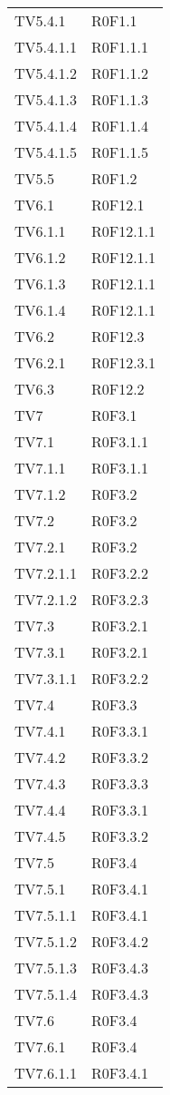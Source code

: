 \documentclass[PianoDiQualifica.tex]{subfiles}
\begin{document}
\begin{longtable}[H]{P{6.5cm}P{7cm}}
	TV5.4.1  & R0F1.1 \\ 
	TV5.4.1.1  & R0F1.1.1 \\ 
	TV5.4.1.2  & R0F1.1.2 \\ 
	TV5.4.1.3  & R0F1.1.3 \\ 
	TV5.4.1.4  & R0F1.1.4 \\ 
	TV5.4.1.5  & R0F1.1.5 \\ 
	TV5.5  & R0F1.2 \\ 
	TV6.1  & R0F12.1 \\ 
	TV6.1.1  & R0F12.1.1 \\ 
	TV6.1.2  & R0F12.1.1 \\ 
	TV6.1.3  & R0F12.1.1 \\ 
	TV6.1.4  & R0F12.1.1 \\ 
	TV6.2  & R0F12.3 \\ 
	TV6.2.1  & R0F12.3.1 \\ 
	TV6.3 &  R0F12.2 \\ 
	TV7  & R0F3.1 \\ 
	TV7.1  & R0F3.1.1 \\ 
	TV7.1.1  & R0F3.1.1 \\ 
	TV7.1.2  & R0F3.2 \\ 
	TV7.2  & R0F3.2 \\ 
	TV7.2.1  & R0F3.2 \\ 
	TV7.2.1.1  & R0F3.2.2 \\ 
	TV7.2.1.2  & R0F3.2.3 \\ 
	TV7.3  & R0F3.2.1 \\ 
	TV7.3.1  & R0F3.2.1 \\ 
	TV7.3.1.1  & R0F3.2.2 \\ 
	TV7.4  & R0F3.3 \\ 
	TV7.4.1  & R0F3.3.1 \\ 
	TV7.4.2  & R0F3.3.2 \\ 
	TV7.4.3  & R0F3.3.3 \\ 
	TV7.4.4  & R0F3.3.1 \\ 
	TV7.4.5  & R0F3.3.2 \\ 
	TV7.5  & R0F3.4 \\ 
	TV7.5.1  & R0F3.4.1 \\ 
	TV7.5.1.1  & R0F3.4.1 \\ 
	TV7.5.1.2  & R0F3.4.2 \\ 
	TV7.5.1.3 & R0F3.4.3\\ 
	TV7.5.1.4 & R0F3.4.3 \\ 
	TV7.6  & R0F3.4 \\ 
	TV7.6.1  & R0F3.4 \\ 
	TV7.6.1.1  & R0F3.4.1 \\ 

\end{longtable}
\end{document}
